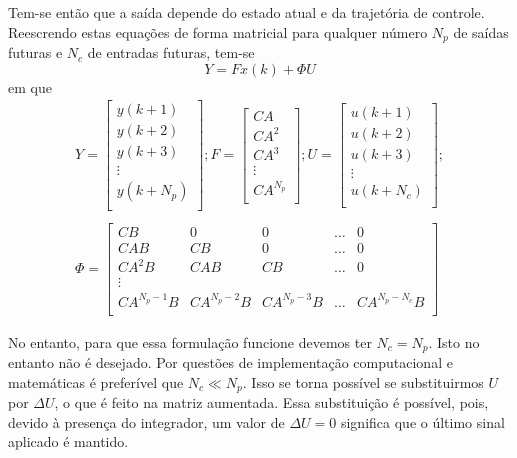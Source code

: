 Tem-se então que a saída depende do estado atual e da trajetória de controle.
Reescrendo estas equações de forma matricial para qualquer número \( N_p \) de
saídas futuras e \( N_c\) de entradas futuras, tem-se
%
\begin{equation}
	\label{eq:Y}
	Y = F x(k) + \Phi U
\end{equation}
%
em que
%
\begin{equation}
	\begin{split}
		Y=
		\begin{bmatrix}
			y(k+1)   \\
			y(k+2)   \\
			y(k+3)   \\
			\vdots{} \\
			y(k+N_p) \\
		\end{bmatrix};
		F=
		\begin{bmatrix}
			CA       \\
			CA^2     \\
			CA^3     \\
			\vdots{} \\
			CA^{N_p} \\
		\end{bmatrix};
		U=
		\begin{bmatrix}
			u(k+1)   \\
			u(k+2)   \\
			u(k+3)   \\
			\vdots{} \\
			u(k+N_c) \\
		\end{bmatrix};
		\\
		\\
		\Phi=
		\begin{bmatrix}
			CB          & 0           & 0           & \hdots{} & 0             \\
			CAB         & CB          & 0           & \hdots{} & 0             \\
			CA^2B       & CAB         & CB          & \hdots{} & 0             \\
			\vdots{}    &             &             &          &               \\
			CA^{N_p-1}B & CA^{N_p-2}B & CA^{N_p-3}B & \hdots{} & CA^{N_p-N_c}B \\
		\end{bmatrix}
	\end{split}
\end{equation}

No entanto, para que essa formulação funcione devemos ter \( N_c = N_p \). Isto
no entanto não é desejado. Por questões de implementação computacional e
matemáticas é preferível que \( N_c \ll N_p \). Isso se torna possível se
substituirmos \( U \) por \( \Delta{}U \), o que é feito na matriz aumentada.
Essa substituição é possível, pois, devido à presença do integrador, um valor de
\( \Delta{}U = 0 \) significa que o último sinal aplicado é mantido.

